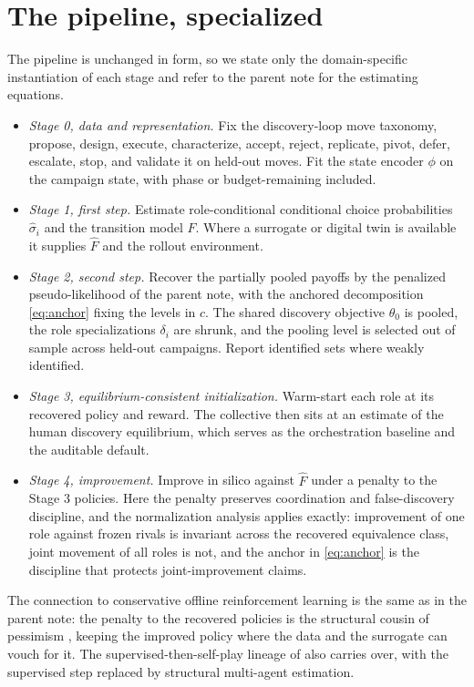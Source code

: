 \documentclass[11pt]{article}
\theoremstyle{definition}
\begin{document}
\section{The pipeline, specialized}

The pipeline is unchanged in form, so we state only the domain-specific instantiation of each stage and refer to the parent note for the estimating equations.

\begin{itemize}[leftmargin=1.4em,itemsep=2pt,topsep=2pt]
  \item \emph{Stage 0, data and representation.} Fix the discovery-loop move taxonomy, propose, design, execute, characterize, accept, reject, replicate, pivot, defer, escalate, stop, and validate it on held-out moves. Fit the state encoder $\phi$ on the campaign state, with phase or budget-remaining included.
  \item \emph{Stage 1, first step.} Estimate role-conditional conditional choice probabilities $\hat\sigma_i$ and the transition model $\hat F$. Where a surrogate or digital twin is available it supplies $\hat F$ and the rollout environment.
  \item \emph{Stage 2, second step.} Recover the partially pooled payoffs by the penalized pseudo-likelihood of the parent note, with the anchored decomposition \eqref{eq:anchor} fixing the levels in $c$. The shared discovery objective $\theta_0$ is pooled, the role specializations $\delta_i$ are shrunk, and the pooling level is selected out of sample across held-out campaigns. Report identified sets where weakly identified.
  \item \emph{Stage 3, equilibrium-consistent initialization.} Warm-start each role at its recovered policy and reward. The collective then sits at an estimate of the human discovery equilibrium, which serves as the orchestration baseline and the auditable default.
  \item \emph{Stage 4, improvement.} Improve in silico against $\hat F$ under a penalty to the Stage 3 policies. Here the penalty preserves coordination and false-discovery discipline, and the normalization analysis applies exactly: improvement of one role against frozen rivals is invariant across the recovered equivalence class, joint movement of all roles is not, and the anchor in \eqref{eq:anchor} is the discipline that protects joint-improvement claims.
\end{itemize}

The connection to conservative offline reinforcement learning is the same as in the parent note: the penalty to the recovered policies is the structural cousin of pessimism \citep{kumar2020cql}, keeping the improved policy where the data and the surrogate can vouch for it. The supervised-then-self-play lineage of \citet{silver2016} also carries over, with the supervised step replaced by structural multi-agent estimation.
\end{document}
